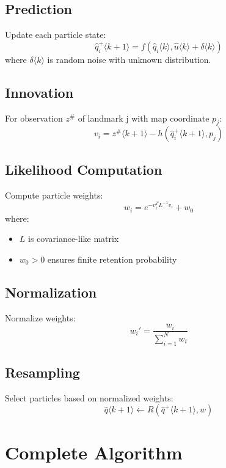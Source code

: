 \documentclass[openany]{book}
\theoremstyle{definition}
\theoremstyle{remark}
\begin{document}
\subsection{Prediction}
Update each particle state:
\begin{equation}
   \hat{q}_i^+\langle k+1 \rangle = f(\hat{q}_i\langle k \rangle, \hat{u}\langle k \rangle + \delta\langle k \rangle)
\end{equation}
where $\delta\langle k \rangle$ is random noise with unknown distribution.

\subsection{Innovation}
For observation $z^\#$ of landmark j with map coordinate $p_j$:
\begin{equation}
   v_i = z^\#\langle k+1 \rangle - h(\hat{q}_i^+\langle k+1 \rangle, p_j)
\end{equation}

\subsection{Likelihood Computation}
Compute particle weights:
\begin{equation}
   w_i = e^{-v_i^T L^{-1}v_i} + w_0
\end{equation}
where:
\begin{itemize}
   \item $L$ is covariance-like matrix
   \item $w_0 > 0$ ensures finite retention probability
\end{itemize}

\subsection{Normalization}
Normalize weights:
\begin{equation}
   w_i' = \frac{w_i}{\sum_{i=1}^N w_i}
\end{equation}

\subsection{Resampling}
Select particles based on normalized weights:
\begin{equation}
   \hat{q}\langle k+1 \rangle \leftarrow R(\hat{q}^+\langle k+1 \rangle, w)
\end{equation}

\section{Complete Algorithm}
\end{document}
